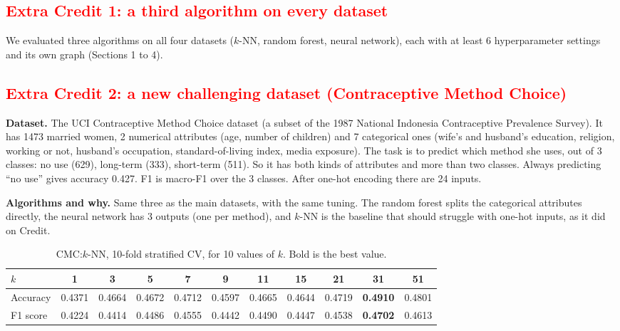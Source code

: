 \documentclass{article}
\begin{document}
\subsection*{\textcolor{red}{Extra Credit 1: a third algorithm on every dataset}}

We evaluated three algorithms on all four datasets ($k$-NN, random forest, neural network), each with at least 6
hyperparameter settings and its own graph (Sections 1 to 4).

\subsection*{\textcolor{red}{Extra Credit 2: a new challenging dataset (Contraceptive Method Choice)}}

\textbf{Dataset.} The UCI Contraceptive Method Choice dataset (a subset of the 1987 National Indonesia
Contraceptive Prevalence Survey). It has 1473 married women, 2 numerical attributes (age, number of children) and
7 categorical ones (wife's and husband's education, religion, working or not, husband's occupation,
standard-of-living index, media exposure). The task is to predict which method she uses, out of 3 classes:
no use (629), long-term (333), short-term (511). So it has both kinds of attributes and more than two classes.
Always predicting ``no use'' gives accuracy 0.427. F1 is macro-F1 over the 3 classes. After one-hot encoding there
are 24 inputs.

\textbf{Algorithms and why.} Same three as the main datasets, with the same tuning. The random forest splits the
categorical attributes directly, the neural network has 3 outputs (one per method), and $k$-NN is the baseline
that should struggle with one-hot inputs, as it did on Credit.

\begin{table}[H]
\centering
\small
\begin{tabular}{lcccccccccc}
\toprule
$k$ & 1 & 3 & 5 & 7 & 9 & 11 & 15 & 21 & 31 & 51 \\
\midrule
Accuracy & 0.4371 & 0.4664 & 0.4672 & 0.4712 & 0.4597 & 0.4665 & 0.4644 & 0.4719 & \textbf{0.4910} & 0.4801 \\
F1 score & 0.4224 & 0.4414 & 0.4486 & 0.4555 & 0.4442 & 0.4490 & 0.4447 & 0.4538 & \textbf{0.4702} & 0.4613 \\
\bottomrule
\end{tabular}
\caption{CMC:$k$-NN, 10-fold stratified CV, for 10 values of $k$. Bold is the best value.}
\end{table}
\end{document}
